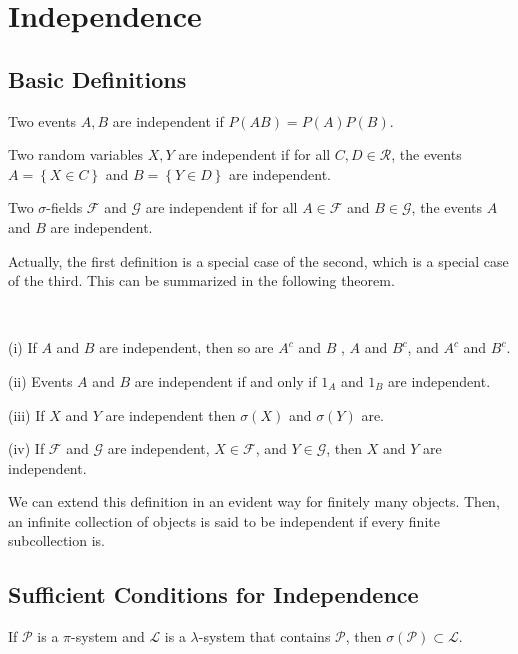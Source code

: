 \chapter{Independence}
\section{Basic Definitions}
\begin{definition}
Two events $A,B$ are independent if $P(AB)=P(A)P(B)$.
\end{definition}
\begin{definition}
Two random variables $X,Y$ are independent if for all $C,D\in \mathcal{R}$, the events $A=\left \{ X\in C \right \} $ and $B=\left \{ Y\in D \right \} $ are independent.
\end{definition}
\begin{definition}
Two $\sigma$-fields $\mathcal{F}$ and $\mathcal{G}$ are independent if for all $A\in\mathcal{F}$ and $B\in\mathcal{G}$, the events $A$ and $B$ are independent.
\end{definition}
Actually, the first definition is a special case of the second, which is a special case of the third. This can be summarized in the following theorem.
\begin{theorem}
\,\par
(i) If $A$ and $B$ are independent, then so are $A^c$ and $B$ , $A$ and $B^c$, and $A^c$ and $B^c$.\par
(ii) Events $A$ and $B$ are independent if and only if $1_A$ and $1_B$ are independent.\par
(iii) If $X$ and $Y$ are independent then $\sigma(X)$ and $\sigma(Y)$ are.\par
(iv) If $\mathcal{F}$ and $\mathcal{G}$ are independent, $X\in\mathcal{F}$, and $Y\in\mathcal{G}$, then $X$ and $Y$ are independent.
\end{theorem}
We can extend this definition in an evident way for finitely many objects. Then, an infinite collection of objects is said to be independent if every finite subcollection is.
\section{Sufficient Conditions for Independence}
\begin{theorem}
If $\mathcal{P}$ is a $\pi$-system and $\mathcal{L}$ is a $\lambda$-system that contains $\mathcal{P}$, then $\sigma(\mathcal{P})\subset \mathcal{L}$.
\end{theorem}



